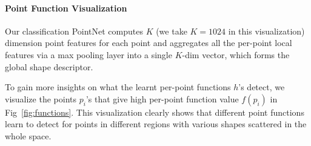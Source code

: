 \paragraph{Point Function Visualization} Our classification PointNet computes $K$ (we take $K=1024$ in this visualization) dimension point features for each point and aggregates all the per-point local features via a max pooling layer into a single $K$-dim vector, which forms the global shape descriptor. 

To gain more insights on what the learnt per-point functions $h$'s detect, we visualize the points $p_i$'s that give high per-point function value $f(p_i)$ in Fig~\ref{fig:functions}. This visualization clearly shows that different point functions learn to detect for points in different regions with various shapes scattered in the whole space. 




